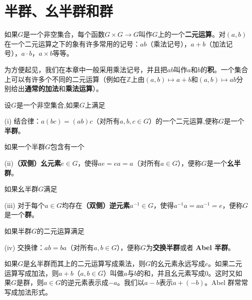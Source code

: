 \documentclass[../../main.tex]{subfiles}
\begin{document}
\section{半群、幺半群和群}

\begin{definition}[二元运算]\label{definition:二元运算定义}
如果$G$是一个非空集合，每个函数$G \times G \to G$叫作$G$上的一个\textbf{二元运算}。对$(a, b)$在一个二元运算之下的象有许多常用的记号：$ab$（乘法记号），$a + b$（加法记号），$a \cdot b$，$a \times b$等等。
\end{definition}
\begin{remark}
为方便起见，我们在本章中一般采用乘法记号，并且把$ab$叫作$a$和$b$的\textbf{积}。一个集合上可以有许多个不同的二元运算（例如在$\mathbb{Z}$上由$(a, b) \longmapsto a + b$和$(a, b) \longmapsto ab$分别给出\textbf{通常的加法}和\textbf{乘法运算}）。
\end{remark}

\begin{definition}[半群和交换半群]
设$G$是一个非空集合,如果$G$上满足

(i) 结合律：$a(bc) = (ab)c$（对所有$a, b, c \in G$）的一个二元运算,便称$G$是一个\textbf{半群}。

如果一个半群$G$包含有一个

(ii)\textbf{（双侧）幺元素}$e \in G$，使得$ae = ea = a$（对所有$a \in G$），便称$G$是一个\textbf{幺半群}。

如果幺半群$G$满足

(iii) 对于每个$a \in G$均存在\textbf{（双侧）逆元素}$a^{-1} \in G$，使得$a^{-1}a = aa^{-1} = e$，便称$G$是一个\textbf{群}。

如果半群$G$的二元运算满足

(iv) 交换律：$ab = ba$（对所有$a, b \in G$），便称$G$为\textbf{交换半群}或者 \textbf{Abel 半群}。
\end{definition}
\begin{remark}
如果$G$是幺半群而其上的二元运算写成乘法，则$G$的幺元素永远写成$e$。如果二元运算写成加法，则$a + b$（$a, b \in G$）叫做$a$与$b$的和，并且幺元素写成$0$。这时又如果$G$是群，则$a \in G$的逆元素表示成$-a$。我们以$a - b$表示$a + (-b)$。Abel 群常常写成加法形式。
\end{remark}
\end{document}
